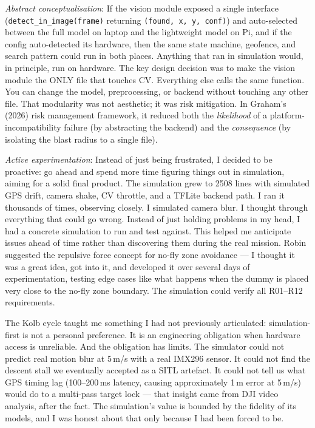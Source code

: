 \textit{Abstract conceptualisation}: If the vision module exposed a single interface (\texttt{detect\_in\_image(frame)} returning \texttt{(found, x, y, conf)}) and auto-selected between the full model on laptop and the lightweight model on Pi, and if the config auto-detected its hardware, then the same state machine, geofence, and search pattern could run in both places. Anything that ran in simulation would, in principle, run on hardware. The key design decision was to make the vision module the ONLY file that touches CV. Everything else calls the same function. You can change the model, preprocessing, or backend without touching any other file. That modularity was not aesthetic; it was risk mitigation. In Graham's (2026) risk management framework, it reduced both the \textit{likelihood} of a platform-incompatibility failure (by abstracting the backend) and the \textit{consequence} (by isolating the blast radius to a single file).

\textit{Active experimentation}: Instead of just being frustrated, I decided to be proactive: go ahead and spend more time figuring things out in simulation, aiming for a solid final product. The simulation grew to 2508 lines with simulated GPS drift, camera shake, CV throttle, and a TFLite backend path. I ran it thousands of times, observing closely. I simulated camera blur. I thought through everything that could go wrong. Instead of just holding problems in my head, I had a concrete simulation to run and test against. This helped me anticipate issues ahead of time rather than discovering them during the real mission. Robin suggested the repulsive force concept for no-fly zone avoidance --- I thought it was a great idea, got into it, and developed it over several days of experimentation, testing edge cases like what happens when the dummy is placed very close to the no-fly zone boundary. The simulation could verify all R01--R12 requirements.

The Kolb cycle taught me something I had not previously articulated: simulation-first is not a personal preference. It is an engineering obligation when hardware access is unreliable. And the obligation has limits. The simulator could not predict real motion blur at 5\,m/s with a real IMX296 sensor. It could not find the descent stall we eventually accepted as a SITL artefact. It could not tell us what GPS timing lag (100--200\,ms latency, causing approximately 1\,m error at 5\,m/s) would do to a multi-pass target lock --- that insight came from DJI video analysis, after the fact. The simulation's value is bounded by the fidelity of its models, and I was honest about that only because I had been forced to be.

